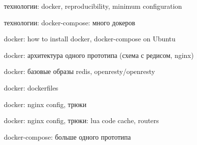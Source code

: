 \documentclass[aspectratio=169,handout,bigger]{beamer}
\begin{document}
\begin{frame}{технологии: docker, reproducibility, minimum configuration}
\end{frame}


\begin{frame}{технологии: docker-compose: много докеров}
\end{frame}


\begin{frame}{docker: how to install docker, docker-compose on Ubuntu}
\end{frame}


\begin{frame}{docker: архитектура одного прототипа (схема с редисом, nginx)}
\end{frame}


\begin{frame}{docker: базовые образы redis, openresty/openresty}
\end{frame}


\begin{frame}{docker: dockerfiles}
\end{frame}


\begin{frame}{docker: nginx config, трюки}
\end{frame}


\begin{frame}{docker: nginx config, трюки: lua code cache, routers}
\end{frame}


\begin{frame}{docker-compose: больше одного прототипа}
\end{frame}
\end{document}
